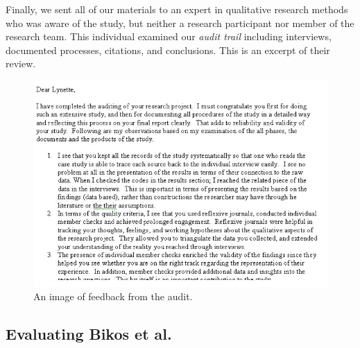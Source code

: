\documentclass[
  english,
]{book}
\begin{document}
Finally, we sent all of our materials to an expert in qualitative research methods who was aware of the study, but neither a research participant nor member of the research team. This individual examined our \emph{audit trail} including interviews, documented processes, citations, and conclusions. This is an excerpt of their review.

\begin{figure}
\centering
\includegraphics{images/Qualitative/audit.jpg}
\caption{An image of feedback from the audit.}
\end{figure}

\hypertarget{evaluating-bikos-et-al.--bikos_longitudinal_2007}{%
\subsection{\texorpdfstring{Evaluating Bikos et al.~\citeyearpar{bikos_longitudinal_2007}}{Evaluating Bikos et al.~{[}-@bikos\_longitudinal\_2007{]}}}\label{evaluating-bikos-et-al.--bikos_longitudinal_2007}}
\end{document}
